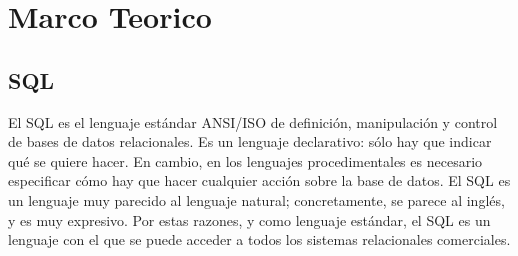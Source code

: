 \documentclass[preprint,12pt]{elsarticle}
\begin{document}
	

%

	

\section{Marco Teorico}
	
\subsection{SQL}	

El SQL es el lenguaje estándar ANSI/ISO de definición, manipulación y control
de bases de datos relacionales. Es un lenguaje declarativo: sólo hay que indicar
qué se quiere hacer. En cambio, en los lenguajes procedimentales es necesario
especificar cómo hay que hacer cualquier acción sobre la base de datos. El SQL
es un lenguaje muy parecido al lenguaje natural; concretamente, se parece al
inglés, y es muy expresivo. Por estas razones, y como lenguaje estándar, el SQL
es un lenguaje con el que se puede acceder a todos los sistemas relacionales
comerciales.



\end{document}

